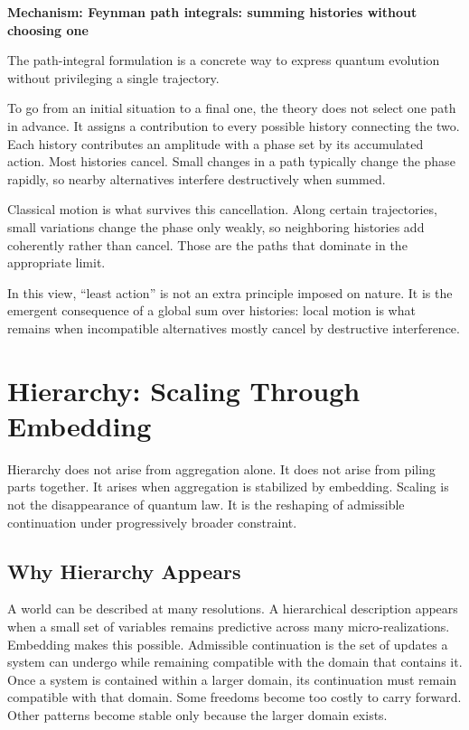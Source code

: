 \documentclass[11pt,twoside,openright]{book}
\newenvironment{mechanismbox}[1]
  {\begin{framed}\noindent\textbf{Mechanism: #1}\par\medskip}
  {\end{framed}}
\begin{document}
\begin{mechanismbox}{Feynman path integrals: summing histories without choosing one}
The path-integral formulation is a concrete way to express quantum evolution without privileging a single trajectory.

To go from an initial situation to a final one, the theory does not select one path in advance. It assigns a contribution to every possible history connecting the two. Each history contributes an amplitude with a phase set by its accumulated action. Most histories cancel. Small changes in a path typically change the phase rapidly, so nearby alternatives interfere destructively when summed.

Classical motion is what survives this cancellation. Along certain trajectories, small variations change the phase only weakly, so neighboring histories add coherently rather than cancel. Those are the paths that dominate in the appropriate limit.

In this view, ``least action'' is not an extra principle imposed on nature.
It is the emergent consequence of a global sum over histories:
local motion is what remains when incompatible alternatives mostly cancel by destructive interference.
\end{mechanismbox}
\chapter{Hierarchy: Scaling Through Embedding}

Hierarchy does not arise from aggregation alone. It does not arise from piling parts together. It arises when aggregation is stabilized by embedding. Scaling is not the disappearance of quantum law. It is the reshaping of admissible continuation under progressively broader constraint.

\section*{Why Hierarchy Appears}

A world can be described at many resolutions. A hierarchical description appears when a small set of variables remains predictive across many micro-realizations. Embedding makes this possible. Admissible continuation is the set of updates a system can undergo while remaining compatible with the domain that contains it. Once a system is contained within a larger domain, its continuation must remain compatible with that domain. Some freedoms become too costly to carry forward. Other patterns become stable only because the larger domain exists.
\end{document}
